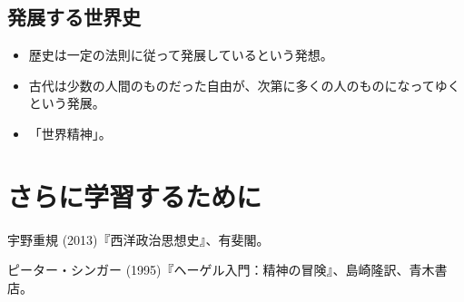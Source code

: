 \documentclass[uplatex,dvipdfmx]{jsarticle} \usepackage{mystyle}%
\begin{document}
\begin{itemize}
\subsection{発展する世界史}

\begin{itemize}
\item 歴史は一定の法則に従って発展しているという発想。
\item 古代は少数の人間のものだった自由が、次第に多くの人のものになってゆくという発展。
\item 「世界精神」。
\end{itemize}






\section{さらに学習するために}

宇野重規 (2013)『西洋政治思想史』、有斐閣。

ピーター・シンガー (1995)『ヘーゲル入門：精神の冒険』、島崎隆訳、青木書店。

\end{itemize}

\nocite{singer83:_hegel}

\ifx\mybook\undefined


\end{document}
